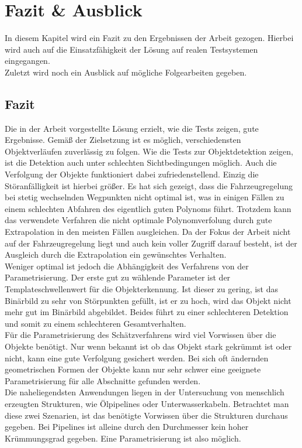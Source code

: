 \cleardoublepage
\section{Fazit \& Ausblick}
In diesem Kapitel wird ein Fazit zu den Ergebnissen der Arbeit gezogen. Hierbei wird auch auf die Einsatzfähigkeit der Lösung auf realen Testsystemen eingegangen.\\
Zuletzt wird noch ein Ausblick auf mögliche Folgearbeiten gegeben.
\subsection{Fazit}
Die in der Arbeit vorgestellte Lösung erzielt, wie die Tests zeigen, gute Ergebnisse. Gemäß der Zielsetzung ist es möglich, verschiedensten Objektverläufen zuverlässig zu folgen. Wie die Tests zur Objektdetektion zeigen, ist die Detektion auch unter schlechten Sichtbedingungen möglich. Auch die Verfolgung der Objekte funktioniert dabei zufriedenstellend. Einzig die Störanfälligkeit ist hierbei größer. Es hat sich gezeigt, dass die Fahrzeugregelung bei stetig wechselnden Wegpunkten nicht optimal ist, was in einigen Fällen zu einem schlechten Abfahren des eigentlich guten Polynoms führt. Trotzdem kann das verwendete Verfahren die nicht optimale Polynomverfolung durch gute Extrapolation in den meisten Fällen ausgleichen. Da der Fokus der Arbeit nicht auf der Fahrzeugregelung liegt und auch kein voller Zugriff darauf besteht, ist der Ausgleich durch die Extrapolation ein gewünschtes Verhalten.\\
Weniger optimal ist jedoch die Abhängigkeit des Verfahrens von der Parametrisierung. Der erste gut zu wählende Parameter ist der Templateschwellenwert für die Objekterkennung. Ist dieser zu gering, ist das Binärbild zu sehr von Störpunkten gefüllt, ist er zu hoch, wird das Objekt nicht mehr gut im Binärbild abgebildet. Beides führt zu einer schlechteren Detektion und somit zu einem schlechteren Gesamtverhalten.\\
Für die Parametrisierung des Schätzverfahrens wird viel Vorwissen über die Objekte benötigt. Nur wenn bekannt ist ob das Objekt stark gekrümmt ist oder nicht, kann eine gute Verfolgung gesichert werden. Bei sich oft ändernden geometrischen Formen der Objekte kann nur sehr schwer eine geeignete Parametrisierung für alle Abschnitte gefunden werden.\\
Die naheliegendsten Anwendungen liegen in der Untersuchung von menschlich erzeugten Strukturen, wie Ölpipelines oder Unterwasserkabeln. Betrachtet man diese zwei Szenarien, ist das benötigte Vorwissen über die Strukturen durchaus gegeben. Bei Pipelines ist alleine durch den Durchmesser kein hoher Krümmungsgrad gegeben. Eine Parametrisierung ist also möglich.\\

